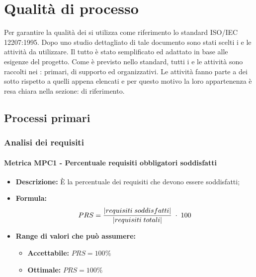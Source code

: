 \section{Qualità di processo}
Per garantire la qualità dei  si utilizza come riferimento lo standard ISO/IEC 12207:1995. Dopo uno studio dettagliato di tale documento sono stati scelti i 
e le attività da utilizzare. Il tutto è stato semplificato ed adattato in base alle esigenze del progetto. Come è previsto nello standard, tutti i  e le attività sono raccolti 
nei : primari, di supporto ed organizzativi. Le attività fanno parte a dei sotto  rispetto a quelli appena elencati e per questo motivo la loro 
appartenenza è resa chiara nella sezione:  di riferimento.

\subsection{Processi primari}

\subsubsection{Analisi dei requisiti}
    \paragraph{Metrica MPC1 - Percentuale requisiti obbligatori soddisfatti}
    \begin{itemize}
        \item \textbf{Descrizione:} È la percentuale dei requisiti che devono essere soddisfatti;
        \item \textbf{Formula:} $$PRS = {|requisiti \; soddisfatti| \over |requisiti \; totali|}\; \cdot \; 100$$
        \item \textbf{Range di valori che può assumere:}
        \begin{itemize}
            \item \textbf{Accettabile:} $PRS = 100\%$
            \item \textbf{Ottimale:} $PRS = 100\%$
        \end{itemize}
    \end{itemize} 

